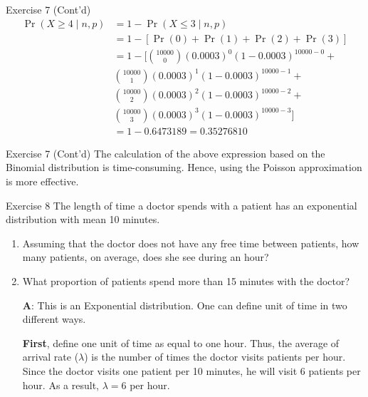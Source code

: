 \documentclass[
  ignorenonframetext,
  aspectratio=43,
]{beamer}
\let\olditem\item
\renewcommand\item{\olditem\justifying}
\begin{document}
\begin{frame}{Exercise 7 (Cont'd)}
\protect\hypertarget{exercise-7-contd-1}{}
\[
\begin{aligned}
\Pr(X \ge 4 \mid n, p) &= 1 - \Pr(X \le 3 \mid n, p) \\
                       &= 1 - [\Pr(0) + \Pr(1) + \Pr(2) + \Pr(3)] \\
                       &= 1 - \Bigg[
                                \binom{10000}{0} (0.0003)^0 (1-0.0003)^{10000-0} + \\
                       \qquad         &\binom{10000}{1} (0.0003)^1 (1-0.0003)^{10000-1} + \\
                       \qquad         &\binom{10000}{2} (0.0003)^2 (1-0.0003)^{10000-2} + \\
                       \qquad         &\binom{10000}{3} (0.0003)^3 (1-0.0003)^{10000-3} \Bigg] \\
                       &= 1 - 0.6473189 = 0.35276810
\end{aligned}
\]
\end{frame}

\begin{frame}{Exercise 7 (Cont'd)}
\protect\hypertarget{exercise-7-contd-2}{}
The calculation of the above expression based on the Binomial
distribution is time-consuming. Hence, using the Poisson approximation
is more effective.
\end{frame}

\begin{frame}{Exercise 8}
\protect\hypertarget{exercise-8}{}
The length of time a doctor spends with a patient has an exponential
distribution with mean 10 minutes.

\begin{enumerate}
\item
  Assuming that the doctor does not have any free time between patients,
  how many patients, on average, does she see during an hour?
\item
  What proportion of patients spend more than 15 minutes with the
  doctor?

  \pause

  \textbf{A}: This is an Exponential distribution. One can define unit
  of time in two different ways.

  \pause

  \textbf{First}, define one unit of time as equal to one hour. Thus,
  the average of arrival rate (\(\lambda\)) is the number of times the
  doctor visits patients per hour. Since the doctor visits one patient
  per 10 minutes, he will visit 6 patients per hour. As a result,
  \(\lambda = 6\) per hour.
\end{enumerate}
\end{frame}
\end{document}
